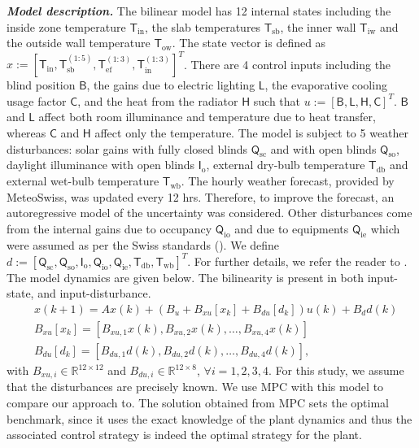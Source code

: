 \documentclass[]{ifacconf}  %
\begin{document}
\textbf{\emph{Model description.}} The bilinear model has 12 internal states including the inside zone temperature $\mathsf{T}_{\mathrm{in}}$, the slab temperatures $\mathsf{T}_{\mathrm{sb}}$, the inner wall $\mathsf{T}_{\mathrm{iw}}$ and the outside wall temperature $\mathsf{T}_{\mathrm{ow}}$. 
The state vector is defined as $x:=[\mathsf{T}_{\mathrm{in}}, \mathsf{T}_{\mathrm{sb}}^{(1:5)}, \mathsf{T}_{\mathrm{ef}}^{(1:3)}, \mathsf{T}_{\mathrm{in}}^{(1:3)}]^T$.
There are 4 control inputs including the blind position $\mathsf{B}$, the gains due to electric lighting $\mathsf{L}$, the evaporative cooling usage factor $\mathsf{C}$, and the heat from the radiator $\mathsf{H}$ such that $u:=[\mathsf{B},\mathsf{L},\mathsf{H},\mathsf{C}]^T$. 
$\mathsf{B}$ and $\mathsf{L}$ affect both room illuminance and temperature due to heat transfer, whereas $\mathsf{C}$ and $\mathsf{H}$ affect only the temperature.
The model is subject to 5 weather disturbances: solar gains with fully closed blinds $\mathsf{Q}_{\mathrm{sc}}$ and with open blinds $\mathsf{Q}_{\mathrm{so}}$, daylight illuminance with open blinds $\mathsf{I}_{\mathrm{o}}$, external dry-bulb temperature $\mathsf{T}_{\mathrm{db}}$ and external wet-bulb temperature $\mathsf{T}_{\mathrm{wb}}$. 
The hourly weather forecast, provided by MeteoSwiss, was updated every 12 hrs. Therefore, to improve the forecast,  an autoregressive model of the uncertainty was considered.
Other disturbances come from the internal gains due to occupancy $\mathsf{Q}_{\mathrm{io}}$ and due to equipments $\mathsf{Q}_{\mathrm{ie}}$ which were assumed as per the Swiss standards (\cite{Merkblatt2006}). We define $d:=[\mathsf{Q}_{\mathrm{sc}},\mathsf{Q}_{\mathrm{so}},\mathsf{I}_{\mathrm{o}},\mathsf{Q}_{\mathrm{io}},\mathsf{Q}_{\mathrm{ie}},\mathsf{T}_{\mathrm{db}},\mathsf{T}_{\mathrm{wb}}]^T$. For further details, we refer the reader to \cite{OldewurtelPHD2011}.
The model dynamics are given below. The bilinearity is present in both input-state, and input-disturbance.
\small
\begin{align}
&x(k+1) = Ax(k)+(B_u +B_{xu}[x_k] + B_{du}[d_k]) u(k)+B_d d(k)\label{eqBilinearModel}\\
&B_{xu}[x_k] = [ B_{xu,1}x(k),B_{xu,2}x(k), \ldots, B_{xu,4}x(k) ]\\
&B_{du}[d_k] = [ B_{du,1}d(k),B_{du,2}d(k), \ldots, B_{du,4}d(k) ],
\end{align}
\normalsize
with $B_{xu,i} \in \mathbb{R}^{12\times12}$ and $B_{du,i} \in \mathbb{R}^{12\times8}$, $\forall i=1,2,3,4$. For this study, we assume that the disturbances are precisely known. We use MPC with this model to compare our approach to.
The solution obtained from MPC sets the optimal benchmark, since it uses the exact knowledge of the plant dynamics and thus the associated control strategy is indeed the optimal strategy for the plant.
\end{document}
